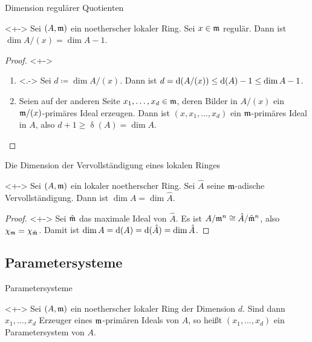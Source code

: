 \begin{frame}{Dimension regulärer Quotienten}
	\begin{corollary}<+->
		\label{cor:dim_of_reg_quot}
		Sei \((A, \mathfrak{m})\) ein noetherscher lokaler Ring. Sei \(x \in \mathfrak{m}\) regulär. Dann ist
		\(\dim A/(x) = \dim A - 1\).
	\end{corollary}
	\begin{proof}<+->
		\begin{enumerate}[<+->]
		\item<.->
			Sei \(d \coloneqq \dim A/(x)\). Dann ist \(d = \operatorname{d}(A/(x)) \le \operatorname{d}(A) - 1 \le \dim A - 1\). 
		\item
			Seien auf der anderen Seite \(x_1, \dotsc, x_d \in \mathfrak{m}\), deren Bilder in \(A/(x)\) ein
			\(\mathfrak{m}/(x)\)-primäres Ideal erzeugen. Dann ist \((x, x_1, \dotsc, x_d)\) ein \(\mathfrak{m}\)-primäres Ideal
			in \(A\), also \(d + 1 \ge \updelta(A) = \dim A\).
		\qedhere
		\end{enumerate}
	\end{proof}
\end{frame}

\begin{frame}{Die Dimension der Vervollständigung eines lokalen Ringes}
	\begin{corollary}<+->
		Sei \((A, \mathfrak{m})\) ein lokaler noetherscher Ring. Sei \(\hat A\) seine \(\mathfrak{m}\)-adische Vervollständigung.
		Dann ist \(\dim A = \dim \hat A\).
	\end{corollary}
	\begin{proof}<+->
		Sei \(\hat{\mathfrak{m}}\) das maximale Ideal von \(\hat A\).
		Es ist \(A/\mathfrak{m}^n \cong \hat A/\hat{\mathfrak{m}}^n\), also \(\chi_{\mathfrak{m}} = \chi_{\hat{\mathfrak{m}}}\). Damit
		ist \(\dim A = \operatorname{d}(A) = \operatorname{d}(\hat A) = \dim \hat A\).
	\end{proof}
\end{frame}

\subsection{Parametersysteme}

\begin{frame}{Parametersysteme}
	\begin{definition}<+->
		Sei \((A, \mathfrak{m})\) ein noetherscher lokaler Ring der Dimension \(d\). Sind dann \(x_1, \dotsc, x_d\) Erzeuger eines
		\(\mathfrak{m}\)-primären Ideals von \(A\), so heißt \((x_1, \dotsc, x_d)\) ein Parametersystem von \(A\).
	\end{definition}
\end{frame}


